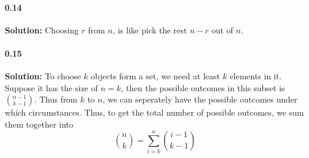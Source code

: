 \documentclass[11pt]{report}
\begin{document}
\paragraph{0.14}\textbf{Solution:} Choosing $r$ from $n$, is like pick the rest $n - r$ out of $n$.
\paragraph{0.15}\textbf{Solution:} To choose $k$ objects form a set, we need at least $k$ elements in it. Suppose it has the size of $n = k$, then the possible outcomes in this subset is $\binom{n - 1}{k - 1}$. Thus from $k$ to $n$, we can seperately have the possible outcomes under which circumstances. Thus, to get the total number of possible outcomes, we sum them together into 
    \[\binom{n}{k} = \sum_{i=k}^n \binom{i-1}{k-1}\]
\end{document}
